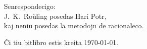 \newpage
\vspace*{4cm}
\begin{center}
Senrespondecigo:\\J.~K.~Roŭling posedas Hari Potr,\\kaj neniu posedas la metodojn de racionaleco.
\end{center}

\vfill
Ĉi tiu bitlibro estis kreita \today{}.
